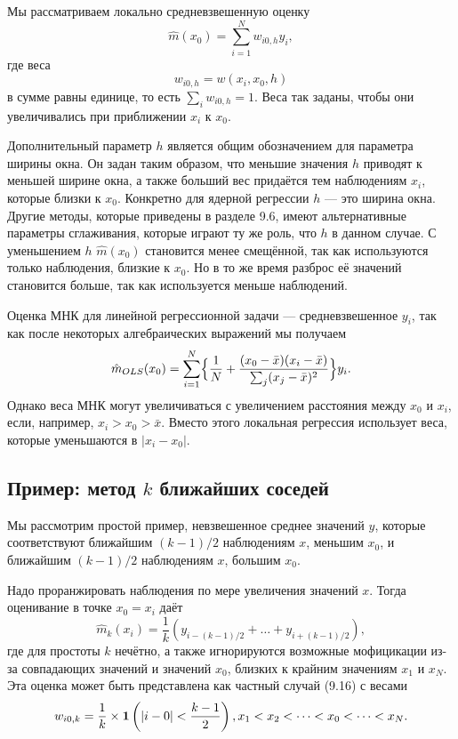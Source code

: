 Мы рассматриваем локально средневзвешенную оценку
\begin{equation}
\hat{m}(x_0) = \sum_{i=1}^N w_{i0,h}y_i,
\end{equation}
где веса
\[
w_{i0,h} = w(x_i, x_0, h)
\]
в сумме равны единице, то есть $\sum_i w_{i0,h} = 1$. Веса так заданы, чтобы они увеличивались при приближении $x_i$ к $x_0$.

Дополнительный параметр $h$ является общим обозначением для параметра ширины окна. Он задан таким образом, что меньшие значения $h$ приводят к меньшей ширине окна, а также больший вес придаётся тем наблюдениям $x_i$, которые близки к $x_0$. Конкретно для ядерной регрессии $h$ --- это ширина окна. Другие методы, которые приведены в разделе 9.6, имеют альтернативные параметры сглаживания, которые играют ту же роль, что $h$ в данном случае. С уменьшением $h$ $\hat{m}(x_0)$ становится менее смещённой, так как используются только наблюдения, близкие к $x_0$. Но в то же время разброс её значений становится больше, так как используется меньше наблюдений.

Оценка МНК для линейной регрессионной задачи --- средневзвешенное $y_i$, так как после некоторых алгебраических выражений мы получаем
\[
\hat{m}_{OLS}(x_0) = \sum_{i=1}^N \Bigl\{\frac{1}{N}+\frac{(x_0-\bar{x})(x_i-\bar{x})}{\sum_j (x_j-\bar{x})^2} \Bigr\} y_i.
\]
Однако веса МНК могут увеличиваться с увеличением расстояния между $x_0$ и $x_i$, если, например, $x_i > x_0 > \bar{x}$. Вместо этого локальная регрессия использует веса, которые уменьшаются в $|x_i - x_0|$. 

\subsection{Пример: метод $k$ ближайших соседей}

Мы рассмотрим простой пример, невзвешенное среднее значений $y$, которые соответствуют ближайшим $(k - 1)/2$ наблюдениям $x$, меньшим $x_0$, и ближайшим $(k - 1)/2$ наблюдениям $x$, большим $x_0$.

Надо проранжировать наблюдения по мере увеличения значений $x$. Тогда оценивание в точке $x_0 = x_i$ даёт
\[
\hat{m}_k(x_i) = \frac{1}{k}(y_{i-(k-1)/2} + \dots + y_{i+(k-1)/2}),
\]
где для простоты $k$ нечётно, а также игнорируются возможные мофицикации из-за совпадающих значений и значений $x_0$, близких к крайним значениям $x_1$ и $x_N$. Эта оценка может быть представлена как частный случай (9.16) с весами
\[
w_{i0,k} = \frac{1}{k} \times {\bf{1}} \left( |i - 0| < \frac{k-1}{2} \right), x_1 < x_2 < \cdots < x_0 < \cdots < x_N.
\]

